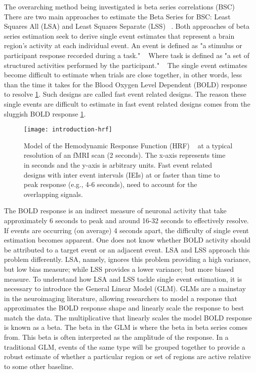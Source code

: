 \documentclass[10pt,letterpaper]{article}
\begin{document}
The overarching method being investigated is beta series correlations (BSC) ~\cite{Rissman2004,Mumford2012,Turner2012a,Abdulrahman2016}
There are two main approaches to estimate the Beta Series for BSC: Least Squares All (LSA) and Least Squares Separate (LSS) ~\cite{Mumford2012}.
Both approaches of beta series estimation seek to derive single event estimates that represent a brain region's activity
at each individual event.
An event is defined as "a stimulus or participant response recorded during a task." ~\cite{Gorgolewski2016}
Where task is defined as "a set of structured activities performed by the participant." ~\cite{Gorgolewski2016}
The single event estimates become difficult to estimate when trials are close together,
in other words, less than the time it takes for the Blood Oxygen Level Dependent (BOLD) response to resolve \ref{fig:introhrf}.
Such designs are called fast event related designs.
The reason these single events are difficult to estimate in fast event related designs comes from
the sluggish BOLD response \ref{fig:introhrf}.

\begin{figure}[H]
  \centering
  \texttt{[image: introduction-hrf]}
  \caption{
    Model of the Hemodynamic Response Function (HRF) ~\cite{Glover1999} at a
    typical resolution of an fMRI scan (2 seconds).
    The x-axis represents time in seconds and the y-axis is arbitrary units.
    Fast event related designs with inter event intervals (IEIs) at or faster than time to peak
    response (e.g., 4-6 seconds), need to account for the overlapping signals.
  }
  \label{fig:introhrf}
\end{figure}

The BOLD response is an indirect measure of neuronal activity that take approximately 6 seconds to
peak and around 16-32 seconds to effectively resolve.
If events are occurring (on average) 4 seconds apart, the difficulty of single event estimation
becomes apparent.
One does not know whether BOLD activity should be attributed to a target event or an
adjacent event.
LSA and LSS approach this problem differently.
LSA, namely, ignores this problem providing a high variance, but low bias measure; while LSS provides
a lower variance; but more biased measure.
To understand how LSA and LSS tackle single event estimation, it is necessary to introduce
the General Linear Model (GLM).
GLMs are a mainstay in the neuroimaging literature, allowing researchers to model
a response that approximates the BOLD response shape and linearly scale the response
to best match the data.
The multiplicative that linearly scales the model BOLD response is known as a beta.
The beta in the GLM is where the beta in beta series comes from.
This beta is often interpreted as the amplitude of the response.
In a traditional GLM, events of the same type will be grouped together
to provide a robust estimate of whether a particular region or set of regions are
active relative to some other baseline.
\end{document}
